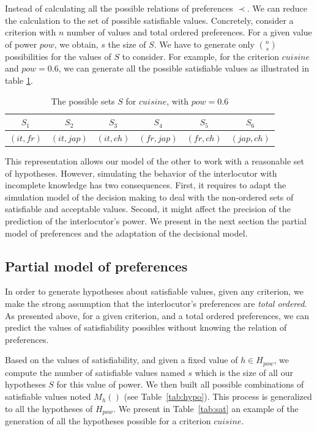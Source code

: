 \documentclass[conference, letterpaper]{IEEEtran}
\begin{document}
	Instead of calculating all the possible relations of preferences $\prec$. We can reduce the calculation to the set of possible satisfiable values.  Concretely, consider a criterion with $n$ number of values and total ordered preferences. For a given value of power $pow$, we obtain, $s$  the size of $S$. We have to generate only $\binom{n}{s}$ possibilities for the values of $S$ to consider. For example, for the criterion $cuisine$ and $pow =0.6$, we can generate all the possible satisfiable values as illustrated in table \ref{tab:sat_poss}.
		\begin{table}[h]
			\centering
			\caption{The possible sets $S$ for $cuisine$, with $pow=0.6$}
			\label{tab:sat_poss}

			\begin{tabular}{|c|c|c|c|c|c|}%
				\hline				
				 $S_1$ & $S_2$ & $S_3$ & $S_4$ & $S_5$ & $S_6$ \\
				\hline$(it,fr)$& $(it,jap)$ & $(it,ch)$ & $(fr,jap)$ & $(fr,ch)$ & $(jap,ch)$ \\
				\hline
			\end{tabular}
		\end{table}
	
	This representation allows our model of the other to work with a reasonable set of hypotheses.  
	However, simulating the behavior of the interlocutor with incomplete knowledge has two consequences. First, it requires to adapt the simulation model of the decision making to deal with the non-ordered sets of satisfiable and acceptable values. Second, it might affect the precision of the prediction of the interlocutor's power.
	We present in the next section the partial model of preferences and the adaptation of the decisional model.
	
	\subsection{Partial model of preferences}
%	
	In order to generate hypotheses about satisfiable values, given any criterion, we make the strong assumption that the interlocutor's preferences are \emph{total ordered}. As presented above, for a given criterion, and a total ordered preferences, we can predict the values of satisfiability possibles without knowing the relation of preferences. 
	
	Based on the values of satisfiability, and given a fixed value of $h \in H_{pow}$, we compute the number of satisfiable values named $s$ which is the size of all our hypotheses $S$ for this value of power. 
	We then built all possible combinations of satisfiable values noted $M_h()$ (see Table~\ref{tab:hypo}). This process is generalized to all the hypotheses of $H_{pow}$. We present in Table~\ref{tab:sat} an example of the generation of all the hypotheses possible for a criterion $cuisine$.
	
\end{document}
